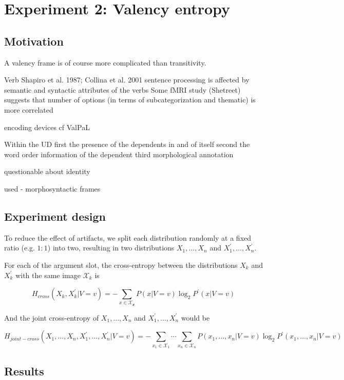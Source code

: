 \section{Experiment 2: Valency entropy}
\subsection{Motivation}

A valency frame is of course more complicated than transitivity.

Verb Shapiro et al. 1987; Collina et al. 2001
sentence processing is affected by semantic and syntactic attributes of the verbs 
Some fMRI study (Shetreet) suggests that number of options (in terms of subcategorization and thematic) is more correlated

encoding devices cf ValPaL

Within the UD
first the presence of the dependents in and of itself
second the word order information of the dependent 
third morphological annotation

questionable about identity

used - morphosyntactic frames

\subsection{Experiment design}


To reduce the effect of artifacts, we split each distribution randomly at a fixed ratio (e.g. $1:1$) into two, resulting in two distributions $X_1,\ldots,X_n$ and $X^{\prime}_{1},\ldots,X^{\prime}_{n}$. 

For each of the argument slot, the cross-entropy between the distributions $X_k$ and $X_k^{\prime}$ with the same image $\mathcal{X}_{k}$ is

$$
H_{cross}{(X_k,X_k^{\prime}|V=v)}=
-\sum\limits_{x\in{}\mathcal{X_{k}}}{P(x|V=v)\log_{2}{P^{\prime}(x|V=v)}}
$$

And the joint cross-entropy of  $X_1,\ldots,X_n$ and $X_1^{\prime},\ldots,X_n^{\prime}$ would be

$$
H_{joint-cross}(X_{1},\ldots,X_{n},X_{1}^{\prime},\ldots,X_{n}^{\prime}|V=v)=
-\sum\limits_{x_1\in{}\mathcal{X}_1}\cdots\sum\limits_{x_n\in{}\mathcal{X}_n}{P(x_1,\ldots,x_{n}|V=v)\log_{2}P^{\prime}(x_1,\ldots,x_n|V=v)}
$$

\subsection{Results}

